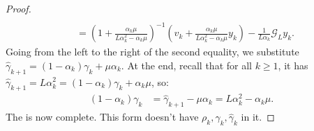 \documentclass[12pt]{article}
\begin{document}
\begin{proof}
\begin{align*}
                \\
                &= 
                \left(
                    1 + \frac{\alpha_k \mu}{L \alpha_k^2 - \alpha_k \mu}
                \right)^{-1}
                \left(
                    v_k + 
                    \frac{\alpha_k \mu}{L \alpha_k^2 - \alpha_k \mu} y_k
                \right)
                - \frac{1}{L\alpha_{k}}\mathcal G_L y_k. 
            \end{align*}
            Going from the left to the right of the second equality, we substitute $\hat \gamma_{k + 1} = (1 - \alpha_k)\gamma_k + \mu\alpha_k$. 
            At the end, recall that for all $k \ge 1$, it has $\hat \gamma_{k + 1} = L \alpha_k^2 = (1 - \alpha_k)\gamma_k + \alpha_k \mu$, so: 
            \begin{align*}
                (1 - \alpha_k)\gamma_k
                &= 
                \hat \gamma_{k + 1} - \mu \alpha_k
                = 
                L\alpha_{k}^2 - \alpha_k\mu. 
            \end{align*}
            The is now complete. 
            This form doesn't have $\rho_k, \gamma_k, \hat \gamma_k$ in it. 
        \end{proof}
        
\end{document}
